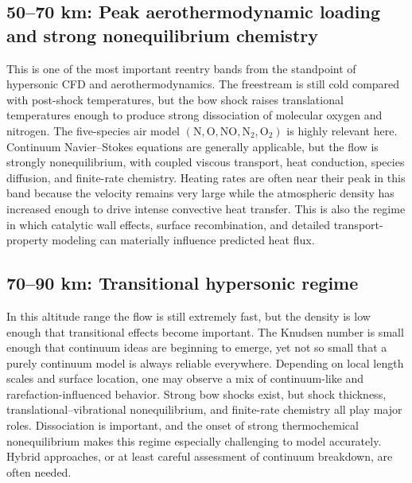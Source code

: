 \documentclass{article}
\begin{document}
\subsection*{50--70 km: Peak aerothermodynamic loading and strong nonequilibrium chemistry}
This is one of the most important reentry bands from the standpoint of hypersonic CFD and aerothermodynamics. The freestream is still cold compared with post-shock temperatures, but the bow shock raises translational temperatures enough to produce strong dissociation of molecular oxygen and nitrogen. The five-species air model $(\mathrm{N},\mathrm{O},\mathrm{NO},\mathrm{N}_2,\mathrm{O}_2)$ is highly relevant here. Continuum Navier--Stokes equations are generally applicable, but the flow is strongly nonequilibrium, with coupled viscous transport, heat conduction, species diffusion, and finite-rate chemistry. Heating rates are often near their peak in this band because the velocity remains very large while the atmospheric density has increased enough to drive intense convective heat transfer. This is also the regime in which catalytic wall effects, surface recombination, and detailed transport-property modeling can materially influence predicted heat flux.

\subsection*{70--90 km: Transitional hypersonic regime}
In this altitude range the flow is still extremely fast, but the density is low enough that transitional effects become important. The Knudsen number is small enough that continuum ideas are beginning to emerge, yet not so small that a purely continuum model is always reliable everywhere. Depending on local length scales and surface location, one may observe a mix of continuum-like and rarefaction-influenced behavior. Strong bow shocks exist, but shock thickness, translational--vibrational nonequilibrium, and finite-rate chemistry all play major roles. Dissociation is important, and the onset of strong thermochemical nonequilibrium makes this regime especially challenging to model accurately. Hybrid approaches, or at least careful assessment of continuum breakdown, are often needed.
\end{document}
